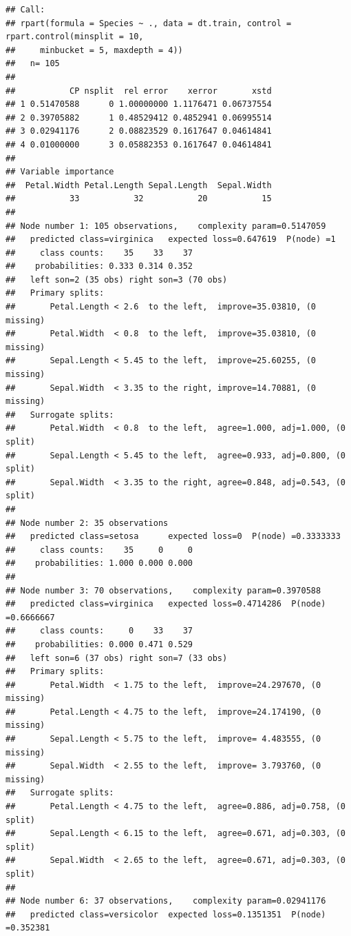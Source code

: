 \documentclass[
]{book}
\theoremstyle{plain}
\theoremstyle{definition}
\theoremstyle{definition}
\theoremstyle{definition}
\theoremstyle{definition}
\theoremstyle{remark}
\begin{document}
\begin{verbatim}
## Call:
## rpart(formula = Species ~ ., data = dt.train, control = rpart.control(minsplit = 10, 
##     minbucket = 5, maxdepth = 4))
##   n= 105 
## 
##           CP nsplit  rel error    xerror       xstd
## 1 0.51470588      0 1.00000000 1.1176471 0.06737554
## 2 0.39705882      1 0.48529412 0.4852941 0.06995514
## 3 0.02941176      2 0.08823529 0.1617647 0.04614841
## 4 0.01000000      3 0.05882353 0.1617647 0.04614841
## 
## Variable importance
##  Petal.Width Petal.Length Sepal.Length  Sepal.Width 
##           33           32           20           15 
## 
## Node number 1: 105 observations,    complexity param=0.5147059
##   predicted class=virginica   expected loss=0.647619  P(node) =1
##     class counts:    35    33    37
##    probabilities: 0.333 0.314 0.352 
##   left son=2 (35 obs) right son=3 (70 obs)
##   Primary splits:
##       Petal.Length < 2.6  to the left,  improve=35.03810, (0 missing)
##       Petal.Width  < 0.8  to the left,  improve=35.03810, (0 missing)
##       Sepal.Length < 5.45 to the left,  improve=25.60255, (0 missing)
##       Sepal.Width  < 3.35 to the right, improve=14.70881, (0 missing)
##   Surrogate splits:
##       Petal.Width  < 0.8  to the left,  agree=1.000, adj=1.000, (0 split)
##       Sepal.Length < 5.45 to the left,  agree=0.933, adj=0.800, (0 split)
##       Sepal.Width  < 3.35 to the right, agree=0.848, adj=0.543, (0 split)
## 
## Node number 2: 35 observations
##   predicted class=setosa      expected loss=0  P(node) =0.3333333
##     class counts:    35     0     0
##    probabilities: 1.000 0.000 0.000 
## 
## Node number 3: 70 observations,    complexity param=0.3970588
##   predicted class=virginica   expected loss=0.4714286  P(node) =0.6666667
##     class counts:     0    33    37
##    probabilities: 0.000 0.471 0.529 
##   left son=6 (37 obs) right son=7 (33 obs)
##   Primary splits:
##       Petal.Width  < 1.75 to the left,  improve=24.297670, (0 missing)
##       Petal.Length < 4.75 to the left,  improve=24.174190, (0 missing)
##       Sepal.Length < 5.75 to the left,  improve= 4.483555, (0 missing)
##       Sepal.Width  < 2.55 to the left,  improve= 3.793760, (0 missing)
##   Surrogate splits:
##       Petal.Length < 4.75 to the left,  agree=0.886, adj=0.758, (0 split)
##       Sepal.Length < 6.15 to the left,  agree=0.671, adj=0.303, (0 split)
##       Sepal.Width  < 2.65 to the left,  agree=0.671, adj=0.303, (0 split)
## 
## Node number 6: 37 observations,    complexity param=0.02941176
##   predicted class=versicolor  expected loss=0.1351351  P(node) =0.352381

\end{verbatim}
\end{document}
